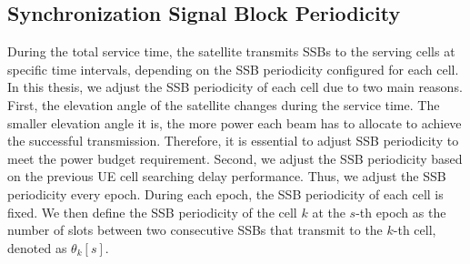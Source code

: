 \subsection{Synchronization Signal Block Periodicity}

During the total service time, the satellite transmits SSBs to the serving cells at specific time intervals, depending on the SSB periodicity configured for each cell. In this thesis, we adjust the SSB periodicity of each cell due to two main reasons. First, the elevation angle of the satellite changes during the service time. The smaller elevation angle it is, the more power each beam has to allocate to achieve the successful transmission. Therefore, it is essential to adjust SSB periodicity to meet the power budget requirement. Second, we adjust the SSB periodicity based on the previous UE cell searching delay performance. Thus, we adjust the SSB periodicity every epoch. During each epoch, the SSB periodicity of each cell is fixed. We then define the SSB periodicity of the cell $k$ at the $s$-th epoch as the number of slots between two consecutive SSBs that transmit to the $k$-th cell, denoted as $\theta_k[s]$. 






